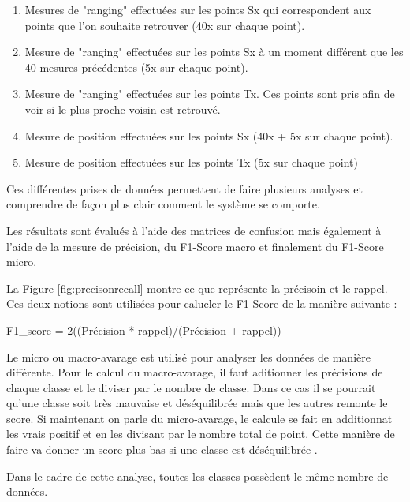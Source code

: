 \begin{enumerate}
	\item Mesures de "ranging" effectuées sur les points Sx qui correspondent aux points que l'on souhaite retrouver (40x sur chaque point).
	\item Mesure de "ranging" effectuées sur les points Sx à un moment différent que les 40 mesures précédentes (5x sur chaque point).
	\item Mesure de "ranging" effectuées sur les points Tx. Ces points sont pris afin de voir si le plus proche voisin est retrouvé.
	\item Mesure de position effectuées sur les points Sx (40x + 5x sur chaque point).
	\item Mesure de position effectuées sur les points Tx (5x sur chaque point) 
\end{enumerate}

Ces différentes prises de données permettent de faire plusieurs analyses et comprendre de façon plus clair comment le système se comporte.

Les résultats sont évalués à l'aide des matrices de confusion mais également à l'aide de la mesure de précision, du F1-Score macro et finalement du F1-Score micro. 

La Figure \ref{fig:precisonrecall} montre ce que représente la précisoin et le rappel. Ces deux notions sont utilisées pour calucler le F1-Score de la manière suivante :

F1\_score = 2((Précision * rappel)/(Précision + rappel))

Le micro ou macro-avarage est utilisé pour analyser les données de manière différente. Pour le calcul du macro-avarage, il faut aditionner les précisions de chaque classe et le diviser par le nombre de classe. Dans ce cas il se pourrait qu'une classe soit très mauvaise et déséquilibrée mais que les autres remonte le score. Si maintenant on parle du micro-avarage, le calcule se fait en additionnat les vrais positif et en les divisant par le nombre total de point. Cette manière de faire va donner un score plus bas si une classe est déséquilibrée \cite{DATASCI}. 

Dans le cadre de cette analyse, toutes les classes possèdent le même nombre de données.

